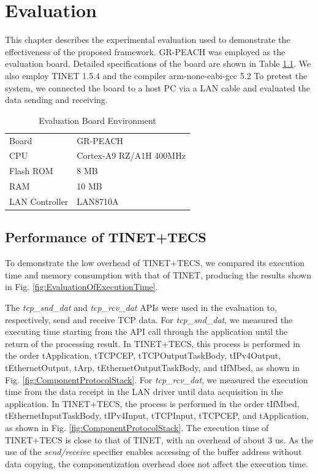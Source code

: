 \documentclass[a4j,12pt,oneside,openany,english]{jsbook}
\begin{document}
\chapter{Evaluation}
\label{sec:Evaluation}

This chapter describes the experimental evaluation used to demonstrate the effectiveness of the proposed framework.
GR-PEACH was employed as the evaluation board.
Detailed specifications of the board are shown in Table \ref{tab:EvaluationBoardEnvironment}.
We also employ TINET 1.5.4 and the compiler arm-none-eabi-gcc 5.2
To pretest the system, we connected the board to a host PC via a LAN cable and evaluated the data sending and receiving.

\begin{table}[t]
    \centering
    \caption{Evaluation Board Environment}
    \begin{tabular}{l|l}
        \hline\hline
        Board           &   GR-PEACH                \\
        CPU             &   Cortex-A9 RZ/A1H 400MHz \\
        Flash ROM       &   8 MB                    \\
        RAM             &   10 MB                   \\
        LAN Controller  &   LAN8710A                \\
        \hline
    \end{tabular}
    \label{tab:EvaluationBoardEnvironment}
\end{table}

\section{Performance of TINET+TECS}

To demonstrate the low overhead of TINET+TECS, we compared its execution time and memory consumption with that of TINET, producing the results shown in Fig. \ref{fig:EvaluationOfExecutionTime}.

The {\it tcp\_snd\_dat} and {\it tcp\_rcv\_dat} APIs were used in the evaluation to, respectively, send and receive TCP data.
For {\it tcp\_snd\_dat}, we measured the executing time starting from the API call through the application until the return of the processing result.
In TINET+TECS, this process is performed in the order tApplication, tTCPCEP, tTCPOutputTaskBody, tIPv4Output, tEthernetOutput, tArp, tEthernetOutputTaskBody, and tIfMbed, as shown in Fig. \ref{fig:ComponentProtocolStack}.
For {\it tcp\_rcv\_dat}, we measured the execution time from the data receipt in the LAN driver until data acquisition in the application.
In TINET+TECS, the process is performed in the order tIfMbed, tEthernetInputTaskBody, tIPv4Input, tTCPInput, tTCPCEP, and tApplication, as shown in Fig. \ref{fig:ComponentProtocolStack}.
The execution time of TINET+TECS is close to that of TINET, with an overhead of about 3 us.
As the use of the {\it send/receive} specifier enables accessing of the buffer address without data copying, the componentization overhead does not affect the execution time.
\end{document}
